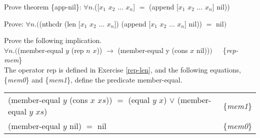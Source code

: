\begin{ExerciseList}
\Exercise {}
Prove theorem \{app-nil\}: $\forall n.$(\textsf{[$x_1$ $x_2$ $\dots$ $x_{n}$]} $=$ \textsf{(append [$x_1$ $x_2$ $\dots$ $x_{n}$] nil)})

\Exercise Prove: $\forall n.($\textsf{(nthcdr (len [$x_1$ $x_2$ $\dots$ $x_n$]) (append [$x_1$ $x_2$ $\dots$ $x_n$]  nil))} $=$ \textsf{nil}$)$

\Exercise\label{member-equal-equations}
Prove the following implication.\\
\hspace*{16mm}$\forall n.($\textsf{(member-equal $y$ (rep $n$ $x$))} $\rightarrow$ \textsf{(member-equal y (cons $x$ nil))}$)$~~~\{\emph{rep-mem}\}\\
The operator \textsf{rep} is defined in Exercise \ref{rep-len}, and
the following equations, \{\emph{mem0}\} and \{\emph{mem1}\}, define the predicate \textsf{member-equal}.
\begin{center}
\begin{tabular}{ll}
\textsf{(member-equal $y$ (cons $x$ $xs$))} $=$ \textsf{(equal $y$ $x$)} $\vee$ \textsf{(member-equal $y$ $xs$)} & \{\emph{mem1}\} \\
\textsf{(member-equal $y$ nil)} $=$ \textsf{nil}                                                         & \{\emph{mem0}\}
\end{tabular}
\end{center}

\end{ExerciseList}


